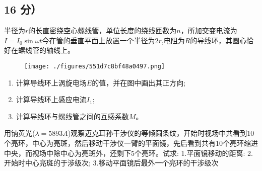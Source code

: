 \subsection{16 分）}
半径为$r$的长直密绕空心螺线管，单位长度的绕线匝数为$n$，所加交变电流为$I = I_0 \sin \omega t$今在管的垂直平面上放置一个半径为$2r$,电阻为$R$的导线环，其圆心恰好在螺线管的轴线上。
\begin{figure}[ht]
\centering
\texttt{[image: ./figures/551d7c8bf48a0497.png]}
\caption{} \label{fig_PKU200_3}
\end{figure}
\begin{enumerate}
\item 计算导线环上涡旋电场$E$的值，并在图中画出其正方向;
\item 计算导线环上感应电流$I_1$;
\item 计算导线环与螺线管之间的互感系数$M$。
\end{enumerate}

用钠黄光($\lambda =5893A$)观察迈克耳孙干涉仪的等倾圆条纹，开始时视场中共看到10个亮环，中心为亮斑，然后移动干涉仪一臂的平面镜，先后看到共有10个亮环缩进中央，而视场中除中心为亮斑外，还剩下5个亮环。试求:
1.平面镜移动的距离:
2.开始时中心亮斑的于涉级次;
3.移动平面镜后最外一个亮环的干涉级次